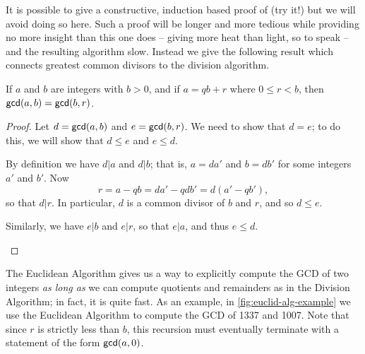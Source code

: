 It is possible to give a constructive, induction based proof of  (try it!) but we will avoid doing so here.
Such a proof will be longer and more tedious while providing no more insight than this one does -- giving more heat than light, so to speak -- and the resulting algorithm slow.
Instead we give the following result which connects greatest common divisors to the division algorithm.

\begin{prop}\label{prop:euclid-alg-zz}
If \(a\) and \(b\) are integers with \(b > 0\), and if \(a = qb + r\) where \(0 \leq r < b\), then \(\mathsf{gcd}(a, b) = \mathsf{gcd}(b, r)\).
\end{prop}

\begin{proof}
Let \(d = \mathsf{gcd}(a, b)\) and \(e = \mathsf{gcd}(b, r)\).
We need to show that \(d = e\); to do this, we will show that \(d \leq e\) and \(e \leq d\).
\begin{proplist}
\item By definition we have \(d|a\) and \(d|b\); that is, \(a = da'\) and \(b = db'\) for some integers \(a'\) and \(b'\).
Now \[ r = a - qb = da' - qdb' = d(a' - qb'), \] so that \(d|r\).
In particular, \(d\) is a common divisor of \(b\) and \(r\), and so \(d \leq e\).
\item Similarly, we have \(e|b\) and \(e|r\), so that \(e|a\), and thus \(e \leq d\).
\qedhere
\end{proplist}
\end{proof}

The Euclidean Algorithm gives us a way to explicitly compute the GCD of two integers \emph{as long as} we can compute quotients and remainders as in the Division Algorithm; in fact, it is quite fast.
As an example, in \autoref{fig:euclid-alg-example} we use the Euclidean Algorithm to compute the GCD of 1337 and 1007.
Note that since \(r\) is strictly less than \(b\), this recursion must eventually terminate with a statement of the form \(\mathsf{gcd}(a, 0)\).

